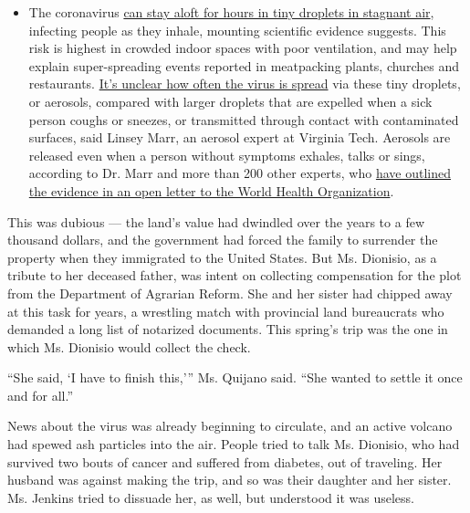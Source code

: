 \begin{itemize}
  \begin{itemize}
  \tightlist
  \item
    The coronavirus
    \href{https://www.nytimes3xbfgragh.onion/2020/07/04/health/239-experts-with-one-big-claim-the-coronavirus-is-airborne.html?action=click\&pgtype=Article\&state=default\&region=MAIN_CONTENT_3\&context=storylines_faq}{can
    stay aloft for hours in tiny droplets in stagnant air}, infecting
    people as they inhale, mounting scientific evidence suggests. This
    risk is highest in crowded indoor spaces with poor ventilation, and
    may help explain super-spreading events reported in meatpacking
    plants, churches and restaurants.
    \href{https://www.nytimes3xbfgragh.onion/2020/07/06/health/coronavirus-airborne-aerosols.html?action=click\&pgtype=Article\&state=default\&region=MAIN_CONTENT_3\&context=storylines_faq}{It's
    unclear how often the virus is spread} via these tiny droplets, or
    aerosols, compared with larger droplets that are expelled when a
    sick person coughs or sneezes, or transmitted through contact with
    contaminated surfaces, said Linsey Marr, an aerosol expert at
    Virginia Tech. Aerosols are released even when a person without
    symptoms exhales, talks or sings, according to Dr. Marr and more
    than 200 other experts, who
    \href{https://academic.oup.com/cid/article/doi/10.1093/cid/ciaa939/5867798}{have
    outlined the evidence in an open letter to the World Health
    Organization}.
  \end{itemize}
\end{itemize}

This was dubious --- the land's value had dwindled over the years to a
few thousand dollars, and the government had forced the family to
surrender the property when they immigrated to the United States. But
Ms. Dionisio, as a tribute to her deceased father, was intent on
collecting compensation for the plot from the Department of Agrarian
Reform. She and her sister had chipped away at this task for years, a
wrestling match with provincial land bureaucrats who demanded a long
list of notarized documents. This spring's trip was the one in which Ms.
Dionisio would collect the check.

``She said, `I have to finish this,''' Ms. Quijano said. ``She wanted to
settle it once and for all.''

News about the virus was already beginning to circulate, and an active
volcano had spewed ash particles into the air. People tried to talk Ms.
Dionisio, who had survived two bouts of cancer and suffered from
diabetes, out of traveling. Her husband was against making the trip, and
so was their daughter and her sister. Ms. Jenkins tried to dissuade her,
as well, but understood it was useless.

